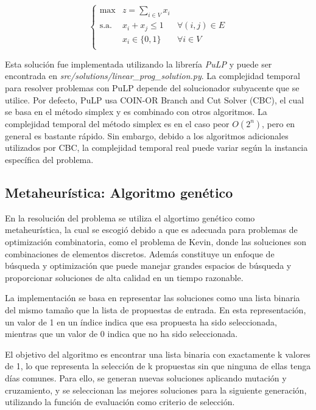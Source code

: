 \documentclass[10pt]{article} %
\begin{document}
	\begin{equation} \left\{
		\begin{matrix}
			\max & \displaystyle z=\sum_{i \in V}x_{i}\\
			\textrm{s.a.} & x_i + x_j \leq 1 & \forall (i, j) \in E \\
			& x_i \in \{0, 1\} & \forall i \in V \\ 
		\end{matrix} \right. 
	\end{equation} 
	
	Esta soluci\'on fue implementada utilizando la librer\'ia \textit{PuLP} y puede ser encontrada en \textit{src/solutions/linear\_prog\_solution.py}. La complejidad temporal para resolver problemas con PuLP depende del solucionador subyacente que se utilice. Por defecto, PuLP usa COIN-OR Branch and Cut Solver (CBC), el cual se basa en el método simplex y es combinado con otros algoritmos. La complejidad temporal del método simplex es en el caso peor $O(2^{n})$, pero en general es bastante r\'apido. Sin embargo, debido a los algoritmos adicionales utilizados por CBC, la complejidad temporal real puede variar según la instancia específica del problema.
	
	
	\subsection{Metaheur\'istica: Algoritmo gen\'etico}
	
	En la resoluci\'on del problema se utiliza el algortimo gen\'etico como metaheur\'istica, la cual se escogi\'o debido a que es adecuada para problemas de optimización combinatoria, como el problema de Kevin, donde las soluciones son combinaciones de elementos discretos. Adem\'as constituye un enfoque de búsqueda y optimización que puede manejar grandes espacios de b\'usqueda y proporcionar soluciones de alta calidad en un tiempo razonable.	
	
	La implementación se basa en representar las soluciones como una lista binaria del mismo tamaño que la lista de propuestas de entrada. En esta representación, un valor de 1 en un índice indica que esa propuesta ha sido seleccionada, mientras que un valor de 0 indica que no ha sido seleccionada.
	
	El objetivo del algoritmo es encontrar una lista binaria con exactamente k valores de 1, lo que representa la selección de k propuestas sin que ninguna de ellas tenga días comunes. Para ello, se generan nuevas soluciones aplicando mutación y cruzamiento, y se seleccionan las mejores soluciones para la siguiente generación, utilizando la función de evaluación como criterio de selección. 
	
\end{document}
